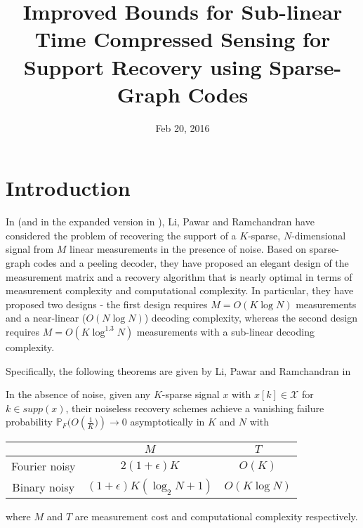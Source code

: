 \documentclass[conference]{IEEEtran}
\begin{document}
\IEEEoverridecommandlockouts


\title{\LARGE{Improved Bounds for Sub-linear Time Compressed Sensing for Support Recovery using Sparse-Graph Codes}}
\author{
}
\date{Feb 20, 2016}
\maketitle

\pagestyle{empty}

\section{Introduction}
In \cite{li2015subisit} (and in the expanded version in \cite{li2015subdraft}), Li, Pawar and Ramchandran have considered the problem of recovering the support of a $K$-sparse, $N$-dimensional signal from $M$ linear measurements in the presence of noise. Based on sparse-graph codes and a peeling decoder, they have proposed an elegant design of the measurement matrix and a recovery algorithm that is nearly optimal in terms of measurement complexity and computational complexity. In particular, they have proposed two designs - the first design requires $M = O(K \log N)$ measurements and a near-linear ($O(N \log N)$) decoding complexity, whereas the second design requires $M = O(K \log^{1.3} N)$ measurements with a sub-linear decoding complexity.

Specifically, the following theorems are given by Li, Pawar and Ramchandran in \cite{li2015subdraft}
\begin{theorem}\label{thm:li1}
In the absence of noise, given any $K$-sparse signal $x$ with $x[k] \in \mathcal{X}$ for $k \in supp (x)$, their noiseless recovery schemes achieve a vanishing failure probability $\mathbb{P}_F(O\left(\frac{1}{K})\right) \rightarrow 0$ asymptotically in $K$ and $N$ with
\begin{center}
\begin{tabular}{|c|c|c|}
  \hline
   &  $M$ &  $T$ \\
  \hline
  Fourier noisy & $2(1+\epsilon)K$ & $O(K)$ \\
  \hline
  Binary noisy & $(1+\epsilon)K(\log_2 N+1)$ & $O(K \log N)$ \\
  \hline
\end{tabular}
\end{center}
where $M$ and $T$ are measurement cost and computational complexity respectively.
\end{theorem}
\vspace{2ex}
\end{document}
